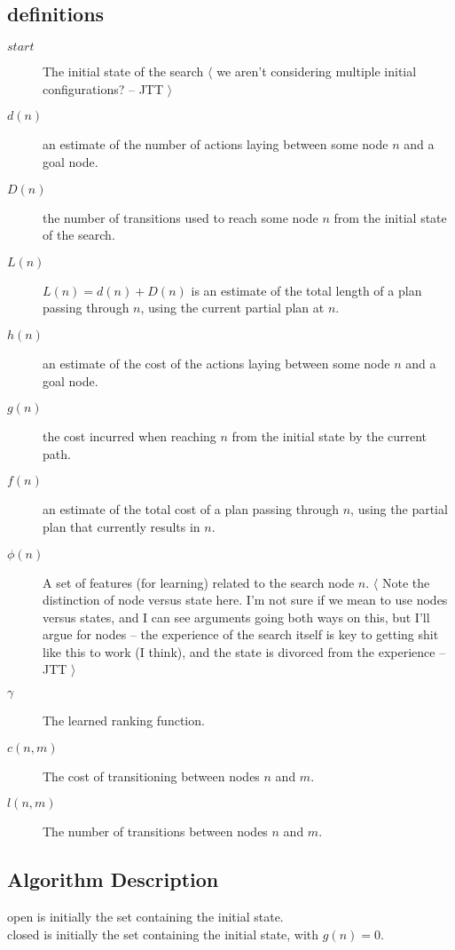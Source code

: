 \documentclass{report}
\newcommand{\note}[1]{$\langle$ #1 $\rangle$}
\begin{document}
\subsection{definitions}
\begin{description}
  \item[$\mathit{start}$] The initial state of the search \note{we aren't
    considering multiple initial configurations? -- JTT}
  \item[$d(n)$] an estimate of the number of actions laying between
    some node $n$ and a goal node.
  \item[$D(n)$] the number of transitions used to reach some node $n$
    from the initial state of the search.
  \item[$L(n)$] $L(n) = d(n) + D(n)$ is an estimate of the total
    length of a plan passing through $n$, using the current partial
    plan at $n$.
  \item[$h(n)$] an estimate of the cost of the actions laying between
    some node $n$ and a goal node.
  \item[$g(n)$] the cost incurred when reaching $n$ from the initial
    state by the current path.
  \item[$f(n)$] an estimate of the total cost of a plan passing
    through $n$, using the partial plan that currently results in $n$.
  \item[$\phi(n)$] A set of features (for learning) related to the
    search node $n$. \note{Note the distinction of node versus state
      here.  I'm not sure if we mean to use nodes versus states, and I
      can see arguments going both ways on this, but I'll argue for
      nodes -- the experience of the search itself is key to getting
      shit like this to work (I think), and the state is divorced from
      the experience -- JTT}
  \item[$\gamma$] The learned ranking function.
  \item[$c(n,m)$] The cost of transitioning between nodes $n$ and $m$.
  \item[$l(n,m)$] The number of transitions between nodes $n$ and $m$.
\end{description}

\subsection{Algorithm Description}

  open is initially the set containing the initial state.\\
  closed is initially the set containing the initial state, with $g(n) = 0$.\\
\end{document}
